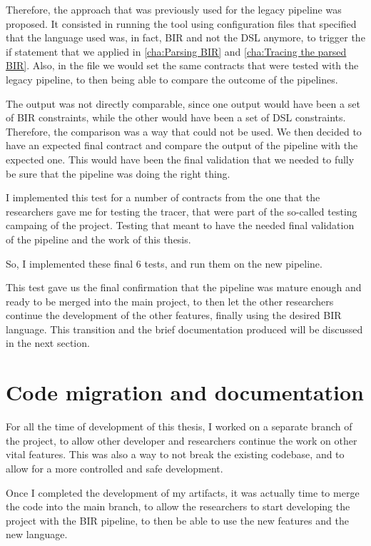 Therefore, the approach that was previously used for the legacy pipeline was
proposed. It consisted in running the tool using configuration files that specified
that the language used was, in fact, BIR and not the DSL anymore, to trigger the
if statement that we applied in \ref{cha:Parsing BIR} and
\ref{cha:Tracing the parsed BIR}. Also, in the file we would set the same
contracts that were tested with the legacy pipeline, to then being able to compare
the outcome of the pipelines.

The output was not directly comparable, since one output would have been a set
of BIR constraints, while the other would have been a set of DSL constraints.
Therefore, the comparison was a way that could not be used. We then decided to
have an expected final contract and compare the output of the pipeline with the
expected one. This would have been the final validation that we needed to fully be
sure that the pipeline was doing the right thing.

I implemented this test for a number of contracts from the one that the researchers
gave me for testing the tracer, that were part of the so-called testing campaing
of the project. Testing that meant to have the needed final validation of the pipeline
and the work of this thesis.

So, I implemented these final 6 tests, and run them on the new pipeline.

This test gave us the final confirmation that the pipeline was mature enough and
ready to be merged into the main project, to then let the other researchers
continue the development of the other features, finally using the desired BIR language.
This transition and the brief documentation produced will be discussed in the
next section.

\section{Code migration and documentation}
\label{cha:Code migration and documentation} For all the time of development of
this thesis, I worked on a separate branch of the project, to allow other
developer and researchers continue the work on other vital features. This was also
a way to not break the existing codebase, and to allow for a more controlled and
safe development.

Once I completed the development of my artifacts, it was actually time to merge the
code into the main branch, to allow the researchers to start developing the
project with the BIR pipeline, to then be able to use the new features and the new
language.

